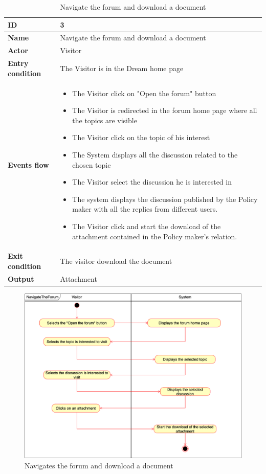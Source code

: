 \begin{longtable}{p{} | p{}}
    \caption{Navigate the forum and download a document}
    \label{tab:navigate_forum}\\
        \hline
        \textbf{ID} & 3\\
        \hline
        \textbf{Name}  &  Navigate the forum and download a document\\
        \hline
        \textbf{Actor}  &  Visitor\\
        \hline
        \textbf{Entry condition}  &  The Visitor is in the Dream home page\\
        \hline
        \textbf{Events flow} & \begin{itemize}
                \item The Visitor click on "Open the forum" button
                \item The Visitor is redirected in the forum home page where all the topics are visible
                \item The Visitor click on the topic of his interest
                \item The System displays all the discussion related to the chosen topic
                \item The Visitor select the discussion he is interested in
                \item The system displays the discussion published by the Policy maker with all the replies from different users.
                \item The Visitor click and start the download of the attachment contained in the Policy maker's relation. 
                \end{itemize}
                 \\
        \hline
        \textbf{Exit condition} &  The visitor download the document\\
        \hline
        \textbf{Output} & Attachment \\ \hline
    
    \end{longtable}
\begin{figure}[h!]
        \centering
        \includegraphics[scale=0.35]{images/use_cases_diagram/visitor_navigate_forum.png}
        \caption{Navigates the forum and download a document}
        \label{fig:navigate_forum}
    \end{figure}
    \FloatBarrier